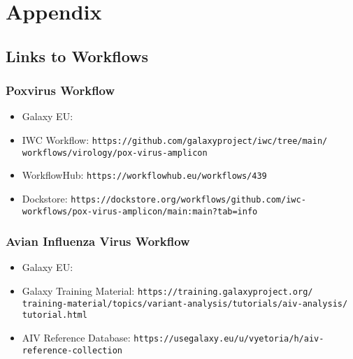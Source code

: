 \chapter*{Appendix}\label{chap:appendix}

% 
\section*{\thesection \quad Links to Workflows}
% 
\subsection*{\thesubsection \quad Poxvirus Workflow}\label{sec:apx-pox-links}
\begin{itemize}
	\setlength{\itemsep}{-0.4cm}
	\item Galaxy EU: \texttt{\todoit}
	\item IWC Workflow: \texttt{https://github.com/galaxyproject/iwc/tree/main/\\workflows/virology/pox-virus-amplicon}
	\item WorkflowHub: \texttt{https://workflowhub.eu/workflows/439}
	\item Dockstore: \texttt{https://dockstore.org/workflows/github.com/iwc-\\workflows/pox-virus-amplicon/main:main?tab=info}
\end{itemize}

% 
\subsection*{\thesubsection \quad Avian Influenza Virus Workflow}\label{sec:apx-aiv-links}
\begin{itemize}
	\setlength{\itemsep}{-0.4cm}
	\item Galaxy EU: \texttt{\todoit}
	\item Galaxy Training Material: \texttt{https://training.galaxyproject.org/\\training-material/topics/variant-analysis/tutorials/aiv-analysis/\\tutorial.html}
	\item AIV Reference Database: \texttt{https://usegalaxy.eu/u/vyetoria/h/aiv-\\reference-collection}
\end{itemize}

